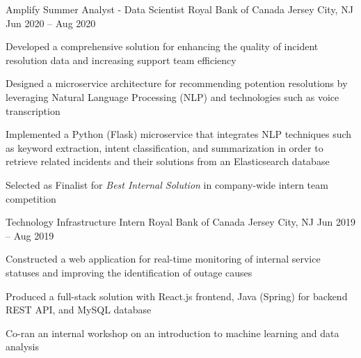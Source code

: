 

\begin{cventries}

  \cventry
	{Amplify Summer Analyst - Data Scientist}
	{Royal Bank of Canada}
	{Jersey City, NJ}
	{Jun 2020 – Aug 2020}
	{
    \begin{cvitems}
		  \item {Developed a comprehensive solution for enhancing the quality of incident resolution data and increasing support team efficiency}
		  \item {Designed a microservice architecture for recommending potention resolutions by leveraging Natural Language Processing (NLP) and technologies such as voice transcription}
		  \item {Implemented a Python (Flask) microservice that integrates NLP techniques such as keyword extraction, intent classification, and summarization in order to retrieve related incidents and their solutions from an Elasticsearch database}
		  \item {Selected as Finalist for \emph{Best Internal Solution} in company-wide intern team competition}
    \end{cvitems}
  }
  
  
  \cventry
  {Technology Infrastructure Intern}
  {Royal Bank of Canada}
  {Jersey City, NJ}
  {Jun 2019 -- Aug 2019}
  {
    \begin{cvitems}
      \item {Constructed a web application for real-time monitoring of internal service statuses and improving the identification of outage causes}
      \item {Produced a full-stack solution with React.js frontend, Java (Spring) for backend REST API, and MySQL database}
      \item {Co-ran an internal workshop on an introduction to machine learning and data analysis}
    \end{cvitems}
  }



\end{cventries}
